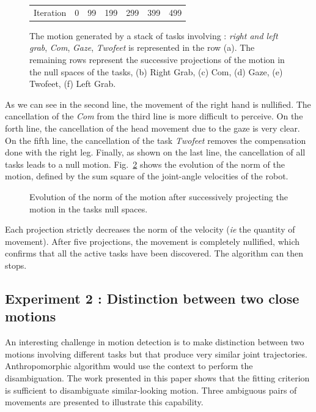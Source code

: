 \documentclass[journal]{IEEEtran}
\begin{document}
\begin{figure}[t]
\begin{tabular}{c@{}c@{}c@{}c@{}c@{}c@{}c}
\\
Iteration & 0 & 99 & 199 & 299 & 399 & 499\\
\end{tabular}
\caption{The motion generated by a stack of tasks involving :
\emph{right and left grab}, \emph{Com}, \emph{Gaze}, \emph{Twofeet} is represented in the row (a).
The remaining rows represent the successive projections of the motion in the null spaces of the tasks,
(b) Right Grab, (c) Com, (d) Gaze, (e) Twofeet, (f) Left Grab.}
\label{fig:snapshotXpqdot}
\end{figure}
As we can see in the second line, the movement of the right hand is nullified. The cancellation of
the \emph{Com} from the third line is more difficult to perceive. On the forth line, the cancellation
of the head movement due to the gaze is very clear. On the fifth line, the cancellation of the task \emph{Twofeet} 
removes the compensation done with the right leg. Finally, as shown on the last line,
the cancellation of all tasks leads to a null motion.
Fig.~\ref{fig:xp3Pqdot} shows the evolution of the norm of the motion,
defined by the sum square of the joint-angle velocities of the robot.
\begin{figure}[t]
\begin{center}
\resizebox{.48\textwidth}{!} {
      
    }
\end{center}
\caption{Evolution of the norm of the motion after successively projecting the motion in the
	tasks null spaces.}
\label{fig:xp3Pqdot}
\end{figure}
Each projection strictly decreases the norm of the velocity (\emph{ie} the quantity of  movement). After
five projections, the movement is completely nullified, which confirms that all the active tasks have been
discovered. The algorithm can then stops.

\subsection{Experiment 2 : Distinction between two close motions}
\label{sec:distinc}
An interesting challenge in motion detection
is to make distinction between two motions
involving different tasks but that produce very similar joint trajectories.
Anthropomorphic algorithm would use the context to perform the disambiguation.
The work presented in this paper shows that the fitting criterion
is sufficient to disambiguate similar-looking motion. Three ambiguous pairs of movements
are presented to illustrate this capability.
\end{document}
